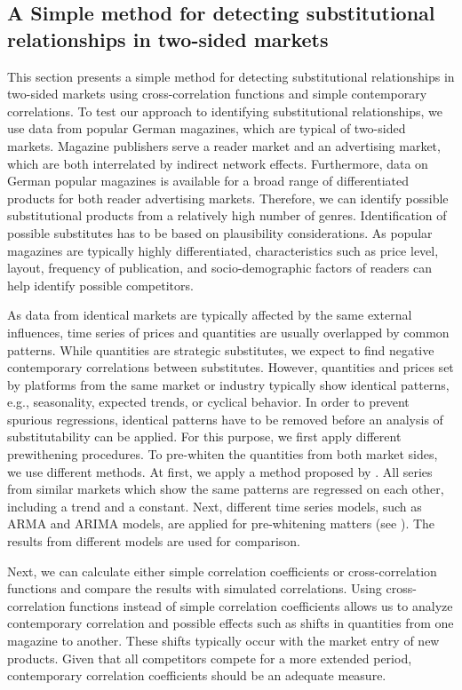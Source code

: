 \documentclass[12pt,a4paper,notitlepage]{article}
\begin{document}
\subsection{A Simple method for detecting substitutional relationships in two-sided markets}

This section presents a simple method for detecting substitutional relationships in two-sided markets using cross-correlation functions and simple contemporary correlations. To test our approach to identifying substitutional relationships, we use data from popular German magazines, which are typical of two-sided markets. Magazine publishers serve a reader market and an advertising market, which are both interrelated by indirect network effects. Furthermore, data on German popular magazines is available for a broad range of differentiated products for both reader advertising markets. Therefore, we can identify possible substitutional products from a relatively high number of genres. Identification of possible substitutes has to be based on plausibility considerations. As popular magazines are typically highly differentiated, characteristics such as price level, layout, frequency of publication, and socio-demographic factors of readers can help identify possible competitors.  

As data from identical markets are typically affected by the same external influences, time series of prices and quantities are usually overlapped by common patterns. While quantities are strategic substitutes, we expect to find negative contemporary correlations between substitutes. However, quantities and prices set by platforms from the same market or industry typically show identical patterns, e.g., seasonality, expected trends, or cyclical behavior. In order to prevent spurious regressions, identical patterns have to be removed before an analysis of substitutability can be applied. For this purpose, we first apply different prewithening procedures. To pre-whiten the quantities from both market sides, we use different methods. At first, we apply a method proposed by \cite{dewenter_essays_2004}. All series from similar markets which show the same patterns are regressed on each other, including a trend and a constant. Next, different time series models, such as ARMA and ARIMA models, are applied for pre-whitening matters (see \cite{box_time_2008}). The results from different models are used for comparison.

Next, we can calculate either simple correlation coefficients or cross-correlation functions and compare the results with simulated correlations. Using cross-correlation functions instead of simple correlation coefficients allows us to analyze contemporary correlation and possible effects such as shifts in quantities from one magazine to another. These shifts typically occur with the market entry of new products. Given that all competitors compete for a more extended period, contemporary correlation coefficients should be an adequate measure. 
\end{document}
